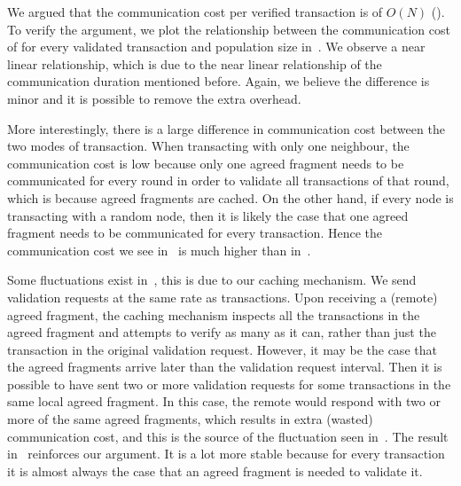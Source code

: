 We argued that the communication cost per verified transaction is of $O(N)$ ().
To verify the argument, we plot the relationship between the communication cost of for every validated transaction and population size in~.
We observe a near linear relationship, which is due to the near linear relationship of the communication duration mentioned before.
Again, we believe the difference is minor and it is possible to remove the extra overhead.

More interestingly, there is a large difference in communication cost between the two modes of transaction.
When transacting with only one neighbour, the communication cost is low because only one agreed fragment needs to be communicated for every round in order to validate all transactions of that round,
which is because agreed fragments are cached.
On the other hand,
if every node is transacting with a random node, then it is likely the case that one agreed fragment needs to be communicated for every transaction.
Hence the communication cost we see in~ is much higher than in~.

Some fluctuations exist in~, this is due to our caching mechanism.
We send validation requests at the same rate as transactions.
Upon receiving a (remote) agreed fragment, the caching mechanism inspects all the transactions in the agreed fragment and attempts to verify as many as it can,
rather than just the transaction in the original validation request.
However, it may be the case that the agreed fragments arrive later than the validation request interval.
Then it is possible to have sent two or more validation requests for some transactions in the same local agreed fragment.
In this case, the remote would respond with two or more of the same agreed fragments,
which results in extra (wasted) communication cost, and this is the source of the fluctuation seen in~.
The result in~ reinforces our argument.
It is a lot more stable because for every transaction it is almost always the case that an agreed fragment is needed to validate it.

